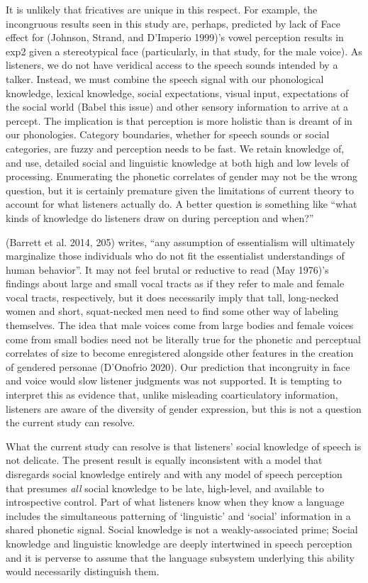 \documentclass[
  letterpaper,
  DIV=11,
  numbers=noendperiod]{scrartcl}
\begin{document}
It is unlikely that fricatives are unique in this respect. For example,
the incongruous results seen in this study are, perhaps, predicted by
lack of Face effect for (Johnson, Strand, and D'Imperio 1999)'s vowel
perception results in exp2 given a stereotypical face (particularly, in
that study, for the male voice). As listeners, we do not have veridical
access to the speech sounds intended by a talker. Instead, we must
combine the speech signal with our phonological knowledge, lexical
knowledge, social expectations, visual input, expectations of the social
world (Babel this issue) and other sensory information to arrive at a
percept. The implication is that perception is more holistic than is
dreamt of in our phonologies. Category boundaries, whether for speech
sounds or social categories, are fuzzy and perception needs to be fast.
We retain knowledge of, and use, detailed social and linguistic
knowledge at both high and low levels of processing. Enumerating the
phonetic correlates of gender may not be the wrong question, but it is
certainly premature given the limitations of current theory to account
for what listeners actually do. A better question is something like
``what kinds of knowledge do listeners draw on during perception and
when?''

(Barrett et al. 2014, 205) writes, ``any assumption of essentialism will
ultimately marginalize those individuals who do not fit the essentialist
understandings of human behavior''. It may not feel brutal or reductive
to read (May 1976)'s findings about large and small vocal tracts as if
they refer to male and female vocal tracts, respectively, but it does
necessarily imply that tall, long-necked women and short, squat-necked
men need to find some other way of labeling themselves. The idea that
male voices come from large bodies and female voices come from small
bodies need not be literally true for the phonetic and perceptual
correlates of size to become enregistered alongside other features in
the creation of gendered personae (D'Onofrio 2020). Our prediction that
incongruity in face and voice would slow listener judgments was not
supported. It is tempting to interpret this as evidence that, unlike
misleading coarticulatory information, listeners are aware of the
diversity of gender expression, but this is not a question the current
study can resolve.

What the current study can resolve is that listeners' social knowledge
of speech is not delicate. The present result is equally inconsistent
with a model that disregards social knowledge entirely and with any
model of speech perception that presumes \emph{all} social knowledge to
be late, high-level, and available to introspective control. Part of
what listeners know when they know a language includes the simultaneous
patterning of `linguistic' and `social' information in a shared phonetic
signal. Social knowledge is not a weakly-associated prime; Social
knowledge and linguistic knowledge are deeply intertwined in speech
perception and it is perverse to assume that the language subsystem
underlying this ability would necessarily distinguish them.
\end{document}
